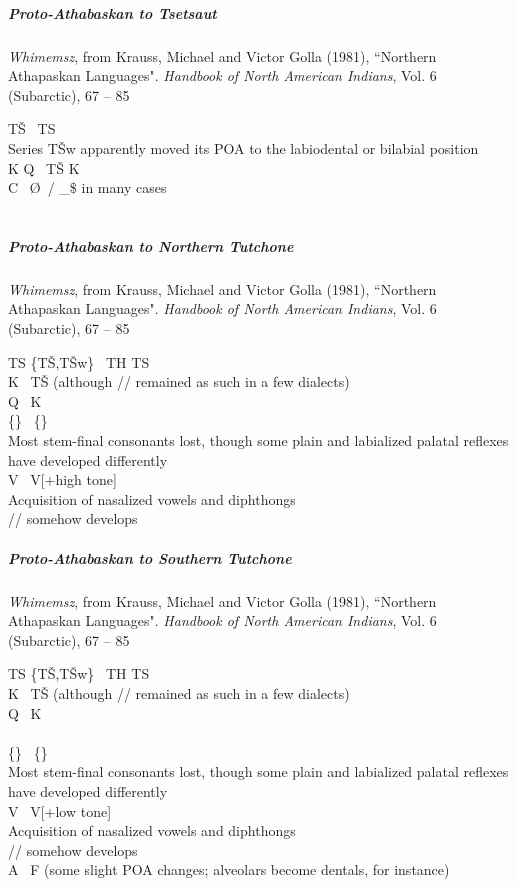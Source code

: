 \documentclass[11pt]{article}
\newcommand{\ipa}{\textipa}
\newcommand{\tab}{\hspace{25pt}}
\newcommand{\change}{\textrightarrow}
\begin{document}
\subparagraph{Proto-Athabaskan to Tsetsaut}{\it Whimemsz}, from Krauss, Michael and Victor Golla (1981), ``Northern Athapaskan Languages". {\it Handbook of North American Indians}, Vol. 6 (Subarctic), 67 -- 85

\tab {\it NB: Whimemsz indicates that the following are to be taken with a grain of salt, as not all of the correspondences are clear due to a lack of detailed sources.}

T\v{S} \change\ TS\\
Series T\v{S}\super w apparently moved its POA to the labiodental or bilabial position\\
K Q \change\ T\v{S} K\\
C \change\ \O\ / _\$ in many cases\\
\ipa{U} \change\ \ipa{o}

\subparagraph{Proto-Athabaskan to Northern Tutchone}{\it Whimemsz}, from Krauss, Michael and Victor Golla (1981), ``Northern Athapaskan Languages". {\it Handbook of North American Indians}, Vol. 6 (Subarctic), 67 -- 85

TS \{T\v{S},T\v{S}\super w\} \change\ TH TS\\
K \change\ T\v{S} (although /\ipa{x\super j}/ remained as such in a few dialects)\\
Q \change\ K\\
\{\ipa{A,@,U}\} \change\ \{\ipa{a,o}\}\\
Most stem-final consonants lost, though some plain and labialized palatal reflexes have developed differently\\
V\ipa{\super P} \change\ V[+high tone]\\
Acquisition of nasalized vowels and diphthongs\\
/\ipa{o}/ somehow develops

\subparagraph{Proto-Athabaskan to Southern Tutchone}{\it Whimemsz}, from Krauss, Michael and Victor Golla (1981), ``Northern Athapaskan Languages". {\it Handbook of North American Indians}, Vol. 6 (Subarctic), 67 -- 85

TS \{T\v{S},T\v{S}\super w\} \change\ TH TS\\
K \change\ T\v{S} (although /\ipa{x\super j}/ remained as such in a few dialects)\\
Q \change\ K\\
\ipa{e a} \change\ \ipa{i e}\\
\{\ipa{A,@,U}\} \change\ \{\ipa{a,o}\}\\
Most stem-final consonants lost, though some plain and labialized palatal reflexes have developed differently\\
V\ipa{\super P} \change\ V[+low tone]\\
Acquisition of nasalized vowels and diphthongs\\
/\ipa{1}/ somehow develops\\
A \change\ F (some slight POA changes; alveolars become dentals, for instance)
\end{document}
